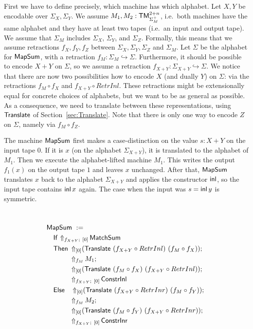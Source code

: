 First we have to define precisely, which machine has which alphabet.  Let $X, Y$ be encodable over $\Sigma_X, \Sigma_Y$.  We assume
$M_1, M_2 : \mathsf{TM}_{\Sigma_M^+}^{2+n}$, i.e.\ both machines have the same alphabet and they have at least two tapes (i.e.\ an input and output tape).  We
assume that $\Sigma_M$ includes $\Sigma_X$, $\Sigma_Y$, and $\Sigma_Z$.  Formally, this means that we assume retractions $f_X,f_Y,f_Z$ between
$\Sigma_X, \Sigma_Y, \Sigma_Z$ and $\Sigma_M$.  Let $\Sigma$ be the alphabet for $\MS{MapSum}$, with a retraction
$f_M : \Sigma_M \hookrightarrow \Sigma$.  Furthermore, it should be possible to encode $X+Y$ on $\Sigma$, so we assume a retraction
$f_{X+Y} : \Sigma_{X+Y} \hookrightarrow \Sigma$.  We notice that there are now two possibilities how to encode $X$ (and dually $Y$) on $\Sigma$: via
the retractions $f_M \circ f_X$ and $f_{X+Y} \circ RetrInl $.  These retractions might be extensionally equal for concrete choices of alphabets, but
we want to be as general as possible.  As a consequence, we need to translate between these representations, using $\mathsf{Translate}$ of
Section~\ref{sec:Translate}.  Note that there is only one way to encode $Z$ on $\Sigma$, namely via $f_M \circ f_Z $.

The machine $\MS{MapSum}$ first makes a case-distinction on the value $s:X+Y$ on the input tape $0$.  If it is $x$ (on the alphabet $\Sigma_{X+Y}$),
it is translated to the alphabet of $M_1$.  Then we execute the alphabet-lifted machine $M_1$.  This writes the output $f_1(x)$ on the output tape $1$
and leaves $x$ unchanged.  After that, $\MS{MapSum}$ translates $x$ back to the alphabet $\Sigma_{X+Y}$ and applies the constructor $\operatorname{\mathsf{inl}}$, so the
input tape contains $\operatorname{\mathsf{inl}} x$ again.  The case when the input was $s=\operatorname{\mathsf{inl}} y$ is symmetric.

\begin{definition}[$\MS{MapSum}$][MapSum]
  \label{def:MapSum}
  ~
  \begin{align*}
    & \MS{MapSum}~:= \\
    &\quad \MS{If}~{\LiftBoth{\MS{MatchSum}}{f_{X+Y}}{\Vector{0}}} \\
    &\quad \MS{Then}~ \LiftTapes{(\MS{Translate}~(f_{X+Y} \circ RetrInl)~(f_M \circ f_X))}{\Vector{0}} \Seq \\
    &\quad \phantom{\MS{Then}}~ \LiftAlphabet{M_1}{f_M} \Seq \\
    &\quad \phantom{\MS{Then}}~ \LiftTapes{(\MS{Translate}~(f_M \circ f_X)~(f_{X+Y} \circ RetrInl))}{\Vector{0}} \Seq \\
    &\quad \phantom{\MS{Then}}~ \LiftBoth{\MS{ConstrInl}}{f_{X+Y}}{\Vector{0}} \\
    &\quad \MS{Else}~~~ \LiftTapes{(\MS{Translate}~(f_{X+Y} \circ RetrInr)~(f_M \circ f_Y))}{\Vector{0}} \Seq \\
    &\quad \phantom{\MS{Then}}~ \LiftAlphabet{M_2}{f_M} \Seq \\
    &\quad \phantom{\MS{Then}}~ \LiftTapes{(\MS{Translate}~(f_M \circ f_Y)~(f_{X+Y} \circ RetrInr))}{\Vector{0}} \Seq \\
    &\quad \phantom{\MS{Then}}~ \LiftBoth{\MS{ConstrInr}}{f_{X+Y}}{\Vector{0}}
  \end{align*}
\end{definition}

